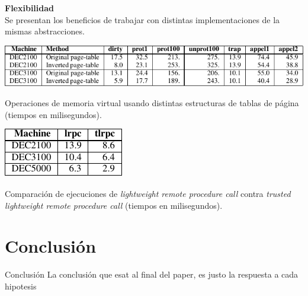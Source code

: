 \documentclass[10pt]{beamer}
\begin{document}
\begin{frame}
\textbf{Flexibilidad} \\[2em]
Se presentan los beneficios de trabajar con distintas implementaciones de la mismas abstracciones. 
\begin{table}
 \includegraphics[scale=0.8]{grafico-pages.pdf}
\caption{Operaciones de memoria virtual usando distintas estructuras de tablas de página (tiempos en milisegundos).}
\end{table}

\begin{table}
\includegraphics[scale=0.8]{grafico-tlrpc.pdf}
\caption{Comparación de ejecuciones de \emph{lightweight remote procedure call} contra \emph{trusted lightweight remote procedure call} (tiempos en milisegundos).}
\end{table}
\end{frame}

\section{Conclusión}

\begin{frame}{Conclusión}
 La conclusión que esat al final del paper, es justo la respuesta a cada hipotesis
\end{frame}



\end{document}
